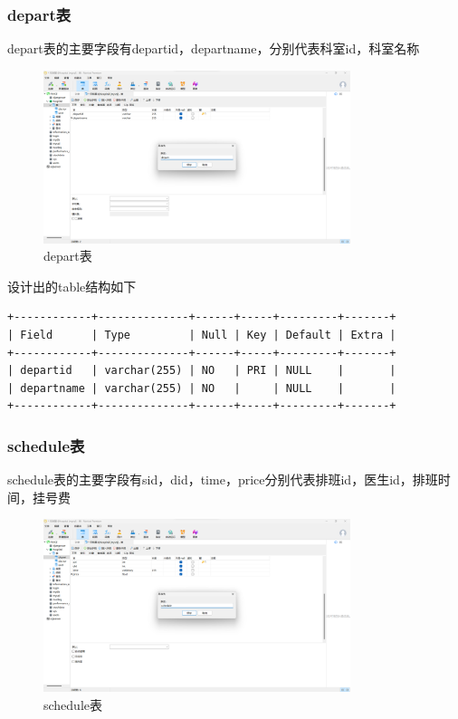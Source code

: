 \documentclass[UTF8,12pt]{article}
\begin{document}
\subsubsection{depart表}

depart表的主要字段有departid，departname，分别代表科室id，科室名称

\begin{figure}[htbp]
    \centering
    \includegraphics[width=0.8\textwidth]{imgs/7.png}
    \caption{depart表}
\end{figure}

设计出的table结构如下

\begin{lstlisting}[frame=shadowbox]
+------------+--------------+------+-----+---------+-------+
| Field      | Type         | Null | Key | Default | Extra |
+------------+--------------+------+-----+---------+-------+
| departid   | varchar(255) | NO   | PRI | NULL    |       |
| departname | varchar(255) | NO   |     | NULL    |       |
+------------+--------------+------+-----+---------+-------+
\end{lstlisting}

\subsubsection{schedule表}

schedule表的主要字段有sid，did，time，price分别代表排班id，医生id，排班时间，挂号费

\newpage

\begin{figure}[htbp]
    \centering
    \includegraphics[width=0.8\textwidth]{imgs/8.png}
    \caption{schedule表}
\end{figure}
\end{document}
